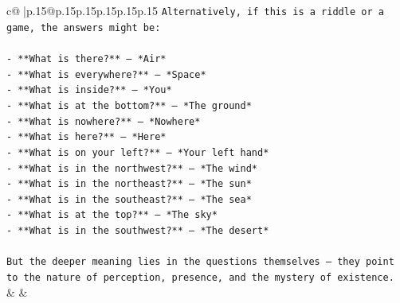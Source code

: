 \documentclass{article}
\begin{document}
{\begin{supertabular}{c@{$\;$}|p{.15\linewidth}@{}p{.15\linewidth}p{.15\linewidth}p{.15\linewidth}p{.15\linewidth}p{.15\linewidth}}
{{{\texttt{Alternatively, if this is a riddle or a game, the answers might be:} \\
\\ 
\texttt{{-} **What is there?** — *Air*  } \\
\texttt{{-} **What is everywhere?** — *Space*  } \\
\texttt{{-} **What is inside?** — *You*  } \\
\texttt{{-} **What is at the bottom?** — *The ground*  } \\
\texttt{{-} **What is nowhere?** — *Nowhere*  } \\
\texttt{{-} **What is here?** — *Here*  } \\
\texttt{{-} **What is on your left?** — *Your left hand*  } \\
\texttt{{-} **What is in the northwest?** — *The wind*  } \\
\texttt{{-} **What is in the northeast?** — *The sun*  } \\
\texttt{{-} **What is in the southeast?** — *The sea*  } \\
\texttt{{-} **What is at the top?** — *The sky*  } \\
\texttt{{-} **What is in the southwest?** — *The desert*} \\
\\ 
\texttt{But the deeper meaning lies in the questions themselves — they point to the nature of perception, presence, and the mystery of existence.} \\
            }
        }
    }
    & & \\ \\


\end{supertabular}}
\end{document}
